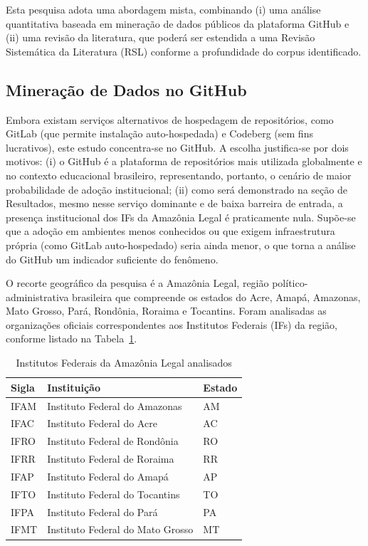 \documentclass[english, spanish, brazilian]{RBIEarticle}
\begin{document}
Esta pesquisa adota uma abordagem mista, combinando (i) uma análise quantitativa baseada em mineração de dados públicos da plataforma GitHub e (ii) uma revisão da literatura, que poderá ser estendida a uma Revisão Sistemática da Literatura (RSL) conforme a profundidade do corpus identificado.

\subsection{Mineração de Dados no GitHub}

Embora existam serviços alternativos de hospedagem de repositórios, como GitLab (que permite instalação auto-hospedada) e Codeberg (sem fins lucrativos), este estudo concentra-se no GitHub. A escolha justifica-se por dois motivos: (i) o GitHub é a plataforma de repositórios mais utilizada globalmente e no contexto educacional brasileiro, representando, portanto, o cenário de maior probabilidade de adoção institucional; (ii) como será demonstrado na seção de Resultados, mesmo nesse serviço dominante e de baixa barreira de entrada, a presença institucional dos IFs da Amazônia Legal é praticamente nula. Supõe-se que a adoção em ambientes menos conhecidos ou que exigem infraestrutura própria (como GitLab auto-hospedado) seria ainda menor, o que torna a análise do GitHub um indicador suficiente do fenômeno.

O recorte geográfico da pesquisa é a Amazônia Legal, região político-administrativa brasileira que compreende os estados do Acre, Amapá, Amazonas, Mato Grosso, Pará, Rondônia, Roraima e Tocantins. Foram analisadas as organizações oficiais correspondentes aos Institutos Federais (IFs) da região, conforme listado na Tabela~\ref{tab:ifs}.

\begin{table}[!htb]
\centering
\caption{Institutos Federais da Amazônia Legal analisados}
\label{tab:ifs}
\begin{tabular}{|l|l|l|}
\hline
\textbf{Sigla} & \textbf{Instituição} & \textbf{Estado} \\
\hline
IFAM & Instituto Federal do Amazonas & AM \\
IFAC & Instituto Federal do Acre & AC \\
IFRO & Instituto Federal de Rondônia & RO \\
IFRR & Instituto Federal de Roraima & RR \\
IFAP & Instituto Federal do Amapá & AP \\
IFTO & Instituto Federal do Tocantins & TO \\
IFPA & Instituto Federal do Pará & PA \\
IFMT & Instituto Federal do Mato Grosso & MT \\
\hline
\end{tabular}
\end{table}
\end{document}
